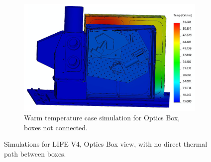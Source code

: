 \begin{figure}
\begin{subfigure}[h]{0.53\textwidth}
        \centering
        \includegraphics[width=\textwidth]{chap3_images/LIFE_V4_images/TA_Full_Model_Iter_12_FIXED.png}
        \caption{Warm temperature case simulation for Optics Box, boxes not connected.}
        \label{fig:LIFE_V4_TA_Optics_2c}
    \end{subfigure}
    \caption{Simulations for LIFE V4, Optics Box view, with no direct thermal path between boxes.}
    \label{LIFE_V4_TA_2_Optics}
\end{figure}

